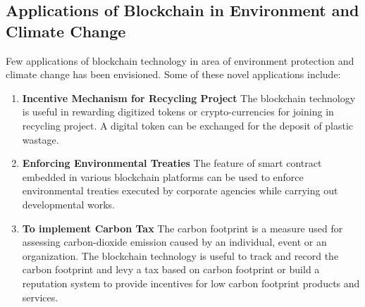 \documentclass[10pt]{IETBook}
\begin{document}
\subsection{Applications of Blockchain in Environment and Climate Change}
Few applications of blockchain technology in area of environment protection and climate change has been envisioned.  Some of these novel applications include:
\begin{enumerate}
    \item {\bf Incentive Mechanism for Recycling Project} The blockchain technology is useful in rewarding digitized tokens or crypto-currencies for joining in recycling project. A digital token can be exchanged  for the deposit of plastic wastage.
     \item {\bf Enforcing Environmental Treaties} The feature of smart contract embedded in various blockchain platforms can be used to enforce environmental treaties executed by corporate agencies while carrying out developmental works.
     \item{\bf To implement Carbon Tax} The carbon footprint is a measure used for assessing carbon-dioxide emission caused by an individual, event or an organization. The blockchain technology is useful to track and record the carbon footprint and levy a tax based on carbon footprint or build a reputation system to provide incentives for low carbon footprint products and services.
    
\end{enumerate}
\end{document}
